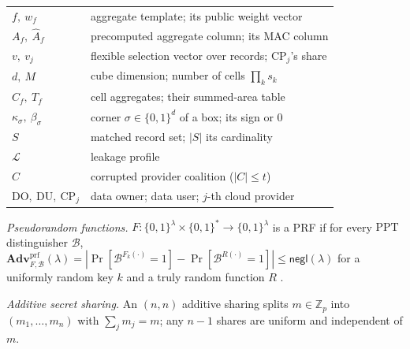 \documentclass[a4paper,fleqn]{cas-sc}
\newcommand{\negl}{\mathsf{negl}}
\newcommand{\PPT}{\mathrm{PPT}}
\newcommand{\Leak}{\mathcal{L}}
\newcommand{\advPRF}{\mathbf{Adv}^{\mathrm{prf}}}
\begin{document}
\begin{table}[pos=htbp]
\begin{tabular}{@{}l>{\raggedright\arraybackslash}p{5.5cm}@{}}
$f,\ w_f$ & aggregate template; its public weight vector \\
$A_f,\ \widehat{A}_f$ & precomputed aggregate column; its MAC column \\
$v,\ v_j$ & flexible selection vector over records; $\text{CP}_j$'s share \\
$d,\ M$ & cube dimension; number of cells $\prod_k s_k$ \\
$C_f,\ T_f$ & cell aggregates; their summed-area table \\
$\kappa_\sigma,\ \beta_\sigma$ & corner $\sigma\in\{0,1\}^d$ of a box; its sign or $0$ \\
$S$ & matched record set; $|S|$ its cardinality \\
$\Leak$ & leakage profile \\
$C$ & corrupted provider coalition ($|C|\le t$) \\
$\mathrm{DO,\ DU},\ \text{CP}_j$ & data owner; data user; $j$-th cloud
provider \\
\bottomrule
\end{tabular}
\end{table}

\emph{Pseudorandom functions.} $F:\{0,1\}^\lambda\times\{0,1\}^*\!\to\!
\{0,1\}^\lambda$ is a PRF if for every $\PPT$ distinguisher $\mathcal{B}$,
$\advPRF_{F,\mathcal{B}}(\lambda)=|\Pr[\mathcal{B}^{F_k(\cdot)}=1]-
\Pr[\mathcal{B}^{R(\cdot)}=1]|\le\negl(\lambda)$ for a uniformly random key
$k$ and a truly random function $R$ \citep{goldreich2019construct}.

\emph{Additive secret sharing.} An $(n,n)$ additive sharing splits
$m\in\mathbb{Z}_p$ into $(m_1,\dots,m_n)$ with $\sum_j m_j=m$; any $n-1$
shares are uniform and independent of $m$.
\end{document}
